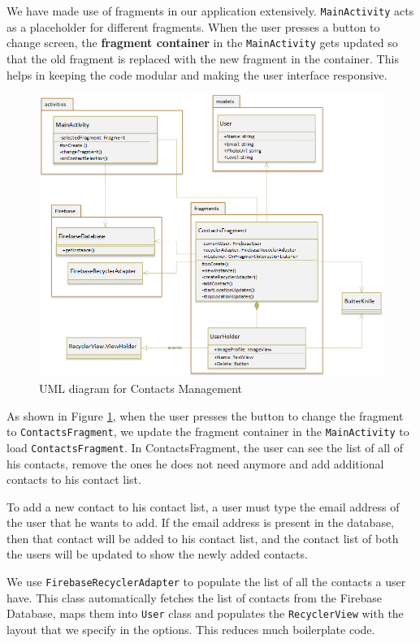 We have made use of fragments in our application extensively. \texttt{MainActivity} acts as a placeholder for different fragments. When the user presses a button to change screen, the \textbf{fragment container} in the \texttt{MainActivity} gets updated so that the old fragment is replaced with the new fragment in the container. This helps in keeping the code modular and making the user interface responsive.

\begin{figure}[H]
    \centering
        \includegraphics[width=1.00\textwidth]{images/uml-contacts.png}
    \caption{UML diagram for Contacts Management}
    \label{fig:uml-contacts}
\end{figure}

As shown in Figure \ref{fig:uml-contacts}, when the user presses the button to change the fragment to \texttt{ContactsFragment}, we update the fragment container in the \texttt{MainActivity} to load \texttt{ContactsFragment}. In ContactsFragment, the user can see the list of all of his contacts, remove the ones he does not need anymore and add additional contacts to his contact list. 

To add a new contact to his contact list, a user must type the email address of the user that he wants to add. If the email address is present in the database, then that contact will be added to his contact list, and the contact list of both the users will be updated to show the newly added contacts.

We use \texttt{FirebaseRecyclerAdapter} to populate the list of all the contacts a user have. This class automatically fetches the list of contacts from the Firebase Database, maps them into \texttt{User} class and populates the \texttt{RecyclerView} with the layout that we specify in the options. This reduces much boilerplate code.

